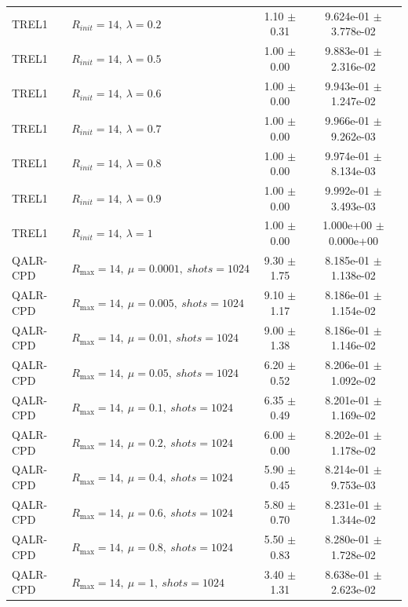 \begin{table}[t]
\begin{tabular}{@{}llcc@{}}
TREL1 & \(R_{init}=14,\ \lambda=0.2\) & 1.10 $\pm$ 0.31 & 9.624e-01 $\pm$ 3.778e-02 \\
TREL1 & \(R_{init}=14,\ \lambda=0.5\) & 1.00 $\pm$ 0.00 & 9.883e-01 $\pm$ 2.316e-02 \\
TREL1 & \(R_{init}=14,\ \lambda=0.6\) & 1.00 $\pm$ 0.00 & 9.943e-01 $\pm$ 1.247e-02 \\
TREL1 & \(R_{init}=14,\ \lambda=0.7\) & 1.00 $\pm$ 0.00 & 9.966e-01 $\pm$ 9.262e-03 \\
TREL1 & \(R_{init}=14,\ \lambda=0.8\) & 1.00 $\pm$ 0.00 & 9.974e-01 $\pm$ 8.134e-03 \\
TREL1 & \(R_{init}=14,\ \lambda=0.9\) & 1.00 $\pm$ 0.00 & 9.992e-01 $\pm$ 3.493e-03 \\
TREL1 & \(R_{init}=14,\ \lambda=1\) & 1.00 $\pm$ 0.00 & 1.000e+00 $\pm$ 0.000e+00 \\
QALR-CPD & \(R_{\max}=14,\ \mu=0.0001,\ shots=1024\) & 9.30 $\pm$ 1.75 & 8.185e-01 $\pm$ 1.138e-02 \\
QALR-CPD & \(R_{\max}=14,\ \mu=0.005,\ shots=1024\) & 9.10 $\pm$ 1.17 & 8.186e-01 $\pm$ 1.154e-02 \\
QALR-CPD & \(R_{\max}=14,\ \mu=0.01,\ shots=1024\) & 9.00 $\pm$ 1.38 & 8.186e-01 $\pm$ 1.146e-02 \\
QALR-CPD & \(R_{\max}=14,\ \mu=0.05,\ shots=1024\) & 6.20 $\pm$ 0.52 & 8.206e-01 $\pm$ 1.092e-02 \\
QALR-CPD & \(R_{\max}=14,\ \mu=0.1,\ shots=1024\) & 6.35 $\pm$ 0.49 & 8.201e-01 $\pm$ 1.169e-02 \\
QALR-CPD & \(R_{\max}=14,\ \mu=0.2,\ shots=1024\) & 6.00 $\pm$ 0.00 & 8.202e-01 $\pm$ 1.178e-02 \\
QALR-CPD & \(R_{\max}=14,\ \mu=0.4,\ shots=1024\) & 5.90 $\pm$ 0.45 & 8.214e-01 $\pm$ 9.753e-03 \\
QALR-CPD & \(R_{\max}=14,\ \mu=0.6,\ shots=1024\) & 5.80 $\pm$ 0.70 & 8.231e-01 $\pm$ 1.344e-02 \\
QALR-CPD & \(R_{\max}=14,\ \mu=0.8,\ shots=1024\) & 5.50 $\pm$ 0.83 & 8.280e-01 $\pm$ 1.728e-02 \\
QALR-CPD & \(R_{\max}=14,\ \mu=1,\ shots=1024\) & 3.40 $\pm$ 1.31 & 8.638e-01 $\pm$ 2.623e-02 \\
\bottomrule
\end{tabular}
\end{table}